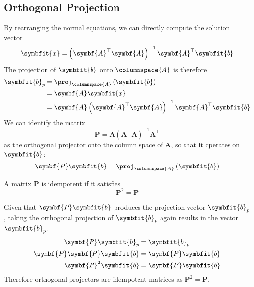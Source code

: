 \documentclass{article}
\begin{document}
\subsection{Orthogonal Projection}
By rearranging the normal equations, we can directly compute the solution vector.
\begin{equation*}
    \symbfit{x} = \left( \symbf{A}^\top \symbf{A} \right)^{-1} \symbf{A}^\top \symbfit{b}
\end{equation*}
The projection of \(\symbfit{b}\) onto \(\columnspace{A}\) is therefore
\begin{align*}
    \symbfit{b}_p & = \proj_{\columnspace{A}} \left( \symbfit{b} \right)                                \\
                  & = \symbf{A} \symbfit{x}                                                             \\
                  & = \symbf{A} \left( \symbf{A}^\top \symbf{A} \right)^{-1} \symbf{A}^\top \symbfit{b}
\end{align*}
We can identify the matrix
\begin{equation*}
    \symbf{P} = \symbf{A} \left( \symbf{A}^\top \symbf{A} \right)^{-1} \symbf{A}^\top
\end{equation*}
as the orthogonal projector onto the column space of \(\symbf{A}\), so that it operates on \(\symbfit{b}\):
\begin{equation*}
    \symbf{P} \symbfit{b} = \proj_{\columnspace{A}} \left( \symbfit{b} \right)
\end{equation*}
\begin{definition}[Idempotent]
    A matrix \(\symbf{P}\) is idempotent if it satisfies
    \begin{equation*}
        \symbf{P}^2 = \symbf{P}
    \end{equation*}
\end{definition}
\begin{theorem}
    Given that \(\symbf{P}\symbfit{b}\) produces the projection vector \(\symbfit{b}_p\),
    taking the orthogonal projection of \(\symbfit{b}_p\) again results in the vector \(\symbfit{b}_p\).
    \begin{align*}
        \symbf{P} \symbfit{b}_p        & = \symbfit{b}_p         \\
        \symbf{P}\symbf{P} \symbfit{b} & = \symbf{P} \symbfit{b} \\
        \symbf{P}^2 \symbfit{b}        & = \symbf{P} \symbfit{b}
    \end{align*}
    Therefore orthogonal projectors are idempotent matrices as \(\symbf{P}^2 = \symbf{P}\).
\end{theorem}
\end{document}
